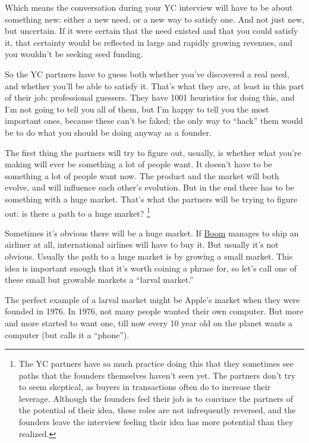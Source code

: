 \documentclass[12pt]{book}
\begin{document}
Which means the conversation during your YC interview will have to be
about something new: either a new need, or a new way to satisfy one. And
not just new, but uncertain. If it were certain that the need existed
and that you could satisfy it, that certainty would be reflected in
large and rapidly growing revenues, and you wouldn't be seeking seed
funding.

So the YC partners have to guess both whether you've discovered a real
need, and whether you'll be able to satisfy it. That's what they are, at
least in this part of their job: professional guessers. They have 1001
heuristics for doing this, and I'm not going to tell you all of them,
but I'm happy to tell you the most important ones, because these can't
be faked; the only way to ``hack'' them would be to do what you should
be doing anyway as a founder.

The first thing the partners will try to figure out, usually, is whether
what you're making will ever be something a lot of people want. It
doesn't have to be something a lot of people want now. The product and
the market will both evolve, and will influence each other's evolution.
But in the end there has to be something with a huge market. That's what
the partners will be trying to figure out: is there a path to a huge
market? \footnote{The YC partners have so much practice doing this that they
sometimes see paths that the founders themselves haven't seen yet. The
partners don't try to seem skeptical, as buyers in transactions often do
to increase their leverage. Although the founders feel their job is to
convince the partners of the potential of their idea, these roles are
not infrequently reversed, and the founders leave the interview feeling
their idea has more potential than they realized.}

Sometimes it's obvious there will be a huge market. If
\href{https://boomsupersonic.com/}{Boom} manages to ship an airliner at
all, international airlines will have to buy it. But usually it's not
obvious. Usually the path to a huge market is by growing a small market.
This idea is important enough that it's worth coining a phrase for, so
let's call one of these small but growable markets a ``larval market.''

The perfect example of a larval market might be Apple's market when they
were founded in 1976. In 1976, not many people wanted their own
computer. But more and more started to want one, till now every 10 year
old on the planet wants a computer (but calls it a ``phone'').
\end{document}
